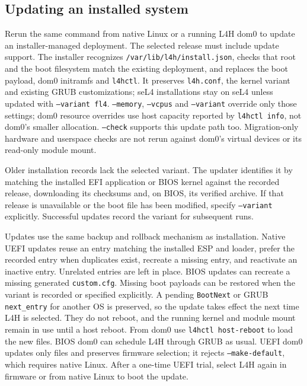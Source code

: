 \documentclass[11pt,a4paper]{report}
\newcommand{\cmd}[1]{\texttt{#1}}
\newcommand{\file}[1]{\texttt{#1}}
\begin{document}
\subsection*{Updating an installed system}

Rerun the same command from native Linux or a running L4H dom0 to update
an installer-managed deployment. The selected release must include update
support. The installer recognizes \file{/var/lib/l4h/install.json},
checks that root and the boot filesystem match the existing deployment,
and replaces the boot payload, dom0 initramfs and \cmd{l4hctl}. It preserves
\file{l4h.conf}, the kernel variant and existing GRUB customizations;
seL4 installations stay on seL4 unless updated with \texttt{--variant fl4}.
\texttt{--memory}, \texttt{--vcpus} and \texttt{--variant} override only
those settings; dom0 resource overrides use host capacity reported by
\cmd{l4hctl info}, not dom0's smaller allocation. \texttt{--check} supports
this update path too. Migration-only hardware and userspace checks are
not rerun against dom0's virtual devices or its read-only module mount.

Older installation records lack the selected variant. The updater
identifies it by matching the installed EFI application or BIOS kernel
against the recorded release, downloading its checksums and, on BIOS,
its verified archive. If that release is unavailable or the boot file
has been modified, specify \texttt{--variant} explicitly. Successful
updates record the variant for subsequent runs.

Updates use the same backup and rollback mechanism as installation.
Native UEFI updates reuse an entry matching the installed ESP and loader,
prefer the recorded entry when duplicates exist, recreate a missing entry,
and reactivate an inactive entry. Unrelated entries are left in place.
BIOS updates can recreate a missing generated \file{custom.cfg}.
Missing boot payloads can be restored when the variant is recorded or
specified explicitly. A pending \texttt{BootNext} or GRUB
\texttt{next\_entry} for another OS is preserved, so the update takes
effect the next time L4H is selected.
They do not reboot, and the running kernel and module mount remain in
use until a host reboot. From dom0 use \cmd{l4hctl host-reboot} to load
the new files. BIOS dom0 can schedule L4H through GRUB as usual. UEFI
dom0 updates only files and preserves firmware selection; it rejects
\texttt{--make-default}, which requires native Linux. After a one-time
UEFI trial, select L4H again in firmware or from native Linux to boot
the update.
\end{document}
